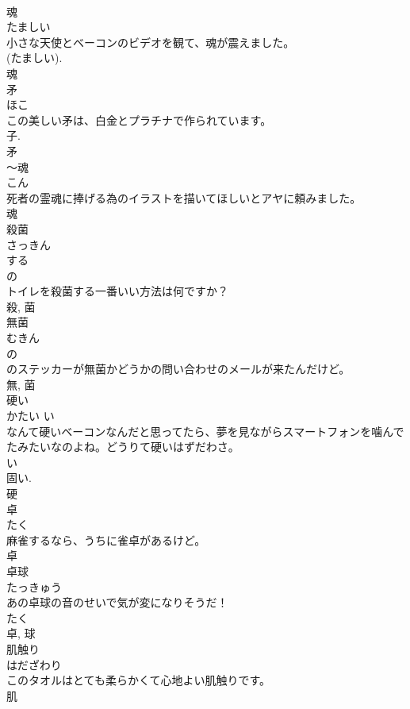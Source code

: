\documentclass[8pt]{extreport}
\begin{document}
\begin{CJK}{UTF8}{min}
\\	魂	
\\	たましい	
\\	小さな天使とベーコンのビデオを観て、魂が震えました。	
\\	(たましい). 
\\	魂	
\\	矛	
\\	ほこ	
\\	この美しい矛は、白金とプラチナで作られています。	
\\	子. 
\\	矛	
\\	〜魂	
\\	こん	
\\	死者の霊魂に捧げる為のイラストを描いてほしいとアヤに頼みました。	
\\	魂	
\\	殺菌	
\\	さっきん	
\\	する 
\\	の 
\\	トイレを殺菌する一番いい方法は何ですか？	
\\	殺, 菌	
\\	無菌	
\\	むきん	
\\	の 
\\	のステッカーが無菌かどうかの問い合わせのメールが来たんだけど。	
\\	無, 菌	
\\	硬い	
\\	かたい	い 
\\	なんて硬いベーコンなんだと思ってたら、夢を見ながらスマートフォンを噛んでたみたいなのよね。どうりて硬いはずだわさ。	
\\	い 
\\	固い. 
\\	硬	
\\	卓	
\\	たく	
\\	麻雀するなら、うちに雀卓があるけど。	
\\	卓	
\\	卓球	
\\	たっきゅう	
\\	あの卓球の音のせいで気が変になりそうだ！	
\\	たく
\\	卓, 球	
\\	肌触り	
\\	はだざわり	
\\	このタオルはとても柔らかくて心地よい肌触りです。	
\\	肌 

\end{CJK}
\end{document}
